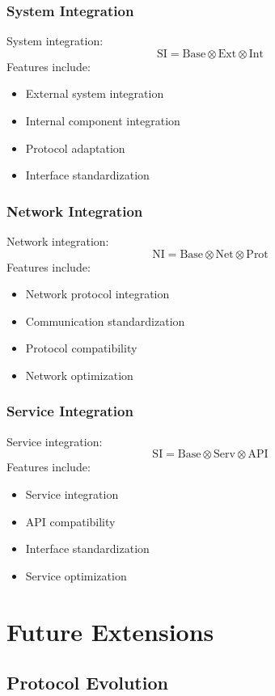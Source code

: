 \documentclass[12pt]{article}
\begin{document}
\subsubsection{System Integration}
System integration:
\begin{equation}
\text{SI} = \text{Base} \otimes \text{Ext} \otimes \text{Int}
\end{equation}
Features include:
\begin{itemize}
\item External system integration
\item Internal component integration
\item Protocol adaptation
\item Interface standardization
\end{itemize}
\subsubsection{Network Integration}
Network integration:
\begin{equation}
\text{NI} = \text{Base} \otimes \text{Net} \otimes \text{Prot}
\end{equation}
Features include:
\begin{itemize}
\item Network protocol integration
\item Communication standardization
\item Protocol compatibility
\item Network optimization
\end{itemize}
\subsubsection{Service Integration}
Service integration:
\begin{equation}
\text{SI} = \text{Base} \otimes \text{Serv} \otimes \text{API}
\end{equation}
Features include:
\begin{itemize}
\item Service integration
\item API compatibility
\item Interface standardization
\item Service optimization
\end{itemize}
\section{Future Extensions}
\subsection{Protocol Evolution}
\end{document}
